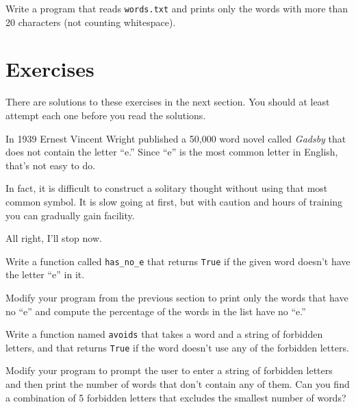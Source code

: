 \documentclass[10pt]{book}
\begin{document}
\begin{exercise}

Write a program that reads {\tt words.txt} and prints only the
words with more than 20 characters (not counting whitespace).

\end{exercise}


\section{Exercises}

There are solutions to these exercises in the next section.
You should at least attempt each one before you read the solutions.

\begin{exercise}

In 1939 Ernest Vincent Wright published a 50,000 word novel called
{\em Gadsby} that does not contain the letter ``e.''  Since ``e'' is
the most common letter in English, that's not easy to do.

In fact, it is difficult to construct a solitary thought without using
that most common symbol.  It is slow going at first, but with caution
and hours of training you can gradually gain facility.

All right, I'll stop now.

Write a function called \verb"has_no_e" that returns {\tt True} if
the given word doesn't have the letter ``e'' in it.

Modify your program from the previous section to print only the words
that have no ``e'' and compute the percentage of the words in the list
have no ``e.''

\end{exercise}


\begin{exercise}

Write a function named {\tt avoids}
that takes a word and a string of forbidden letters, and
that returns {\tt True} if the word doesn't use any of the forbidden
letters.

Modify your program to prompt the user to enter a string
of forbidden letters and then print the number of words that
don't contain any of them.
Can you find a combination of 5 forbidden letters that
excludes the smallest number of words?

\end{exercise}
\end{document}

